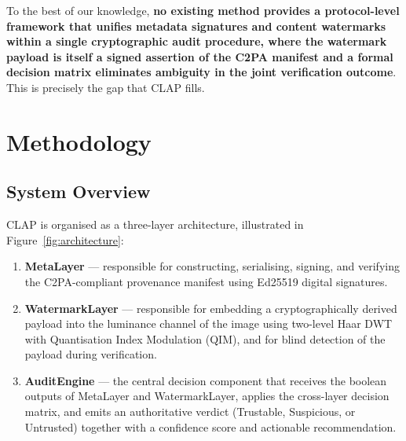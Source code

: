 \documentclass[conference]{IEEEtran}
\begin{document}
To the best of our knowledge, \textbf{no existing method provides a
protocol-level framework that unifies metadata signatures and content
watermarks within a single cryptographic audit procedure, where the
watermark payload is itself a signed assertion of the C2PA manifest and
a formal decision matrix eliminates ambiguity in the joint verification
outcome}.  This is precisely the gap that CLAP fills.

\section{Methodology}

\subsection{System Overview}

CLAP is organised as a three-layer architecture, illustrated in
Figure~\ref{fig:architecture}:

\begin{enumerate}
    \item \textbf{MetaLayer} — responsible for constructing, serialising,
    signing, and verifying the C2PA-compliant provenance manifest using
    Ed25519 digital signatures.
    \item \textbf{WatermarkLayer} — responsible for embedding a
    cryptographically derived payload into the luminance channel of the
    image using two-level Haar DWT with Quantisation Index Modulation
    (QIM), and for blind detection of the payload during verification.
    \item \textbf{AuditEngine} — the central decision component that
    receives the boolean outputs of MetaLayer and WatermarkLayer, applies
    the cross-layer decision matrix, and emits an authoritative verdict
    (Trustable, Suspicious, or Untrusted) together with a confidence score
    and actionable recommendation.
\end{enumerate}
\end{document}
